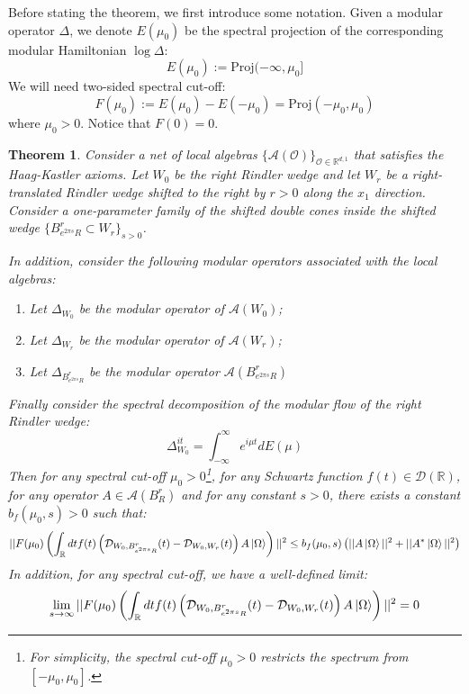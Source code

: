 \documentclass[a4paper,11pt]{article}
\newtheorem{theorem}{Theorem}
\theoremstyle{definition}
\newcommand{\lb}{\left(}
\newcommand{\rb}{\right)}
\begin{document}
Before stating the theorem, we first introduce some notation. Given a modular operator $\Delta$, we denote $E(\mu_0)$ be the spectral projection of the corresponding modular Hamiltonian $\log\Delta$:
\begin{equation}
    E(\mu_0) := \text{Proj}(-\infty, \mu_0]
\end{equation}
We will need two-sided spectral cut-off:
\begin{equation}
    F(\mu_0) := E(\mu_0) - E(-\mu_0) = \text{Proj}(-\mu_0, \mu_0)
\end{equation}
where $\mu_0 > 0$. Notice that $F(0) = 0$. 
\begin{theorem}\label{theorem:mainresult}
    Consider a net of local algebras $\{\mathcal{A}(\mathcal{O})\}_{\mathcal{O}\in\mathbb{R}^{d,1}}$ that satisfies the Haag-Kastler axioms. Let $W_0$ be the right Rindler wedge and let $W_r$ be a right-translated Rindler wedge shifted to the right by $r > 0$ along the $x_1$ direction. Consider a one-parameter family of the shifted double cones inside the shifted wedge $\{B^r_{e^{2\pi s}R} \subset W_r\}_{s > 0}$. 
    
    In addition, consider the following modular operators associated with the local algebras:
    \begin{enumerate}
        \item Let $\Delta_{W_0}$ be the modular operator of $\mathcal{A}(W_0)$;
        \item Let $\Delta_{W_r}$ be the modular operator of $\mathcal{A}(W_r)$;
        \item Let $\Delta_{B^r_{e^{2\pi s}R}}$ be the modular operator $\mathcal{A}(B^r_{e^{2\pi s}R})$
    \end{enumerate}
    Finally consider the spectral decomposition of the modular flow of the right Rindler wedge:
    \begin{equation}
        \Delta_{W_0}^{it} = \int_{-\infty}^\infty e^{i\mu t} dE(\mu)
    \end{equation}
    Then for any spectral cut-off $\mu_0 > 0$\footnote{For simplicity, the spectral cut-off $\mu_0 > 0$ restricts the spectrum from $[-\mu_0, \mu_0]$.}, for any Schwartz function $f(t)\in \mathcal{D}(\mathbb{R})$, for any operator $A\in \mathcal{A}(B^r_R)$ and for any constant $s > 0$, there exists a constant $b_f(\mu_0, s) > 0$ such that:
    \begin{equation}
        ||F(\mu_0)\lb\int_\mathbb{R} dtf(t)\lb\mathcal{D}_{W_0, B^r_{e^{2\pi s}R}}(t) - \mathcal{D}_{W_0, W_r}(t)\rb A\ket{\Omega}\rb||^2 \leq b_f(\mu_0, s)\lb||A\ket{\Omega}||^2 + ||A^*\ket{\Omega}||^2\rb
    \end{equation}
    In addition, for any spectral cut-off, we have a well-defined limit:
    \begin{equation}
        \lim_{s\rightarrow \infty}||F(\mu_0)\lb\int_\mathbb{R} dt f(t)\lb\mathcal{D}_{W_0, B^r_{e^{2\pi s}R}}(t) - \mathcal{D}_{W_0, W_r}(t)\rb A\ket{\Omega}\rb||^2 = 0
    \end{equation}
\end{theorem}
\end{document}
